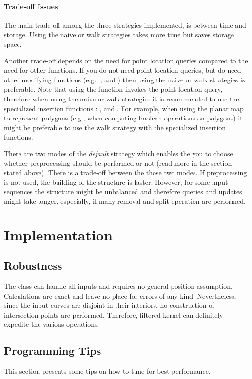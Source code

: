 \paragraph{Trade-off Issues}
The main trade-off among the three strategies implemented, is between
time and storage. Using the naive or walk strategies takes more
time but saves storage space.

Another trade-off depends on the need for point location queries compared
to the need for other functions. If you do not need point location 
queries, but do need other modifying functions (e.g., , 
 and ) then using the naive or walk strategies
is preferable. Note that using the  function invokes the
point location query, therefore when using the naive or walk strategies it
is recommended to use the specialized insertion functions : 
,  and 
.
For example, when using the planar map to represent polygons (e.g., when
computing boolean operations on polygons) it might be preferable to use
the walk strategy with the specialized insertion functions. 

There are two modes of the {\it default\/} strategy which enables the
you to choose whether preprocessing should be performed or not (read
more in the section stated above).
There is a trade-off between the those two modes. If
preprocessing is not used, the building of the structure is faster. However,
for some input sequences the structure might be unbalanced and therefore 
queries and updates might take longer, especially, if many removal and split 
operation are performed.

\section{Implementation}
\subsection{Robustness}
The  class can handle all inputs and
requires no general position assumption. Calculations are exact and
leave no place for errors of any kind. Nevertheless, since the input
curves are disjoint in their interiors, no construction of
intersection points are performed. Therefore, filtered kernel can
definitely expedite the various operations.

\subsection{Programming Tips}
This section presents some tips on how to tune
 for best performance.

